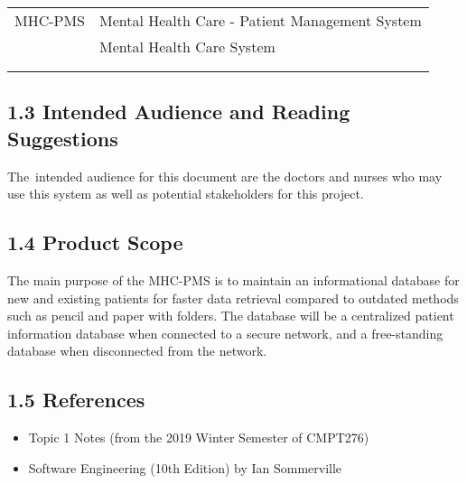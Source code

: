\documentclass[12pt]{article}
\renewcommand{\_}{\kern-1.5pt\textunderscore\kern-1.5pt}
\begin{document}
\begin{table}[H]
 			\centering
\begin{tabular}{p{1.13in}p{4.97in}}
\hline
\multicolumn{1}{|p{1.13in}}{MHC-PMS} & 
\multicolumn{1}{|p{4.97in}|}{Mental Health Care - Patient Management System} \\
\hhline{--}
\multicolumn{1}{|p{1.13in}}{Mentcare} & 
\multicolumn{1}{|p{4.97in}|}{Mental Health Care System} \\
\hhline{--}
\multicolumn{1}{|p{1.13in}}{} & 
\multicolumn{1}{|p{4.97in}|}{} \\
\hhline{--}

\end{tabular}
 \end{table}





\vspace{\baselineskip}
\subsection*{1.3 \hspace*{10pt}Intended Audience and Reading Suggestions}
The\ intended audience for this document are the doctors and nurses who may use this system as well as potential stakeholders for this project.  \par

\subsection*{1.4 \hspace*{10pt}Product Scope}
\tab The main purpose of the MHC-PMS is to maintain an informational database for new and existing patients for faster data retrieval compared to outdated methods such as pencil and paper with folders. The database will be a centralized patient information database when connected to a secure network, and a free-standing database when disconnected from the network.\par

\subsection*{1.5 \hspace*{10pt}References}
\begin{itemize}
	\item Topic 1 Notes (from the 2019 Winter Semester of CMPT276)\par

	\item Software Engineering (10th Edition) by Ian Sommerville
\end{itemize}\par
\end{document}
